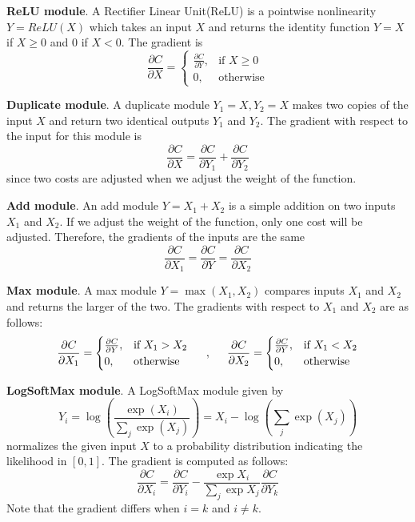 \textbf{ReLU module}.
A Rectifier Linear Unit(ReLU) is a pointwise nonlinearity $Y=ReLU(X)$ which takes an input $X$ and returns the identity function $Y=X$ if $X\geq0$ and $0$ if $X<0$.
The gradient is 
\[
    \frac{\partial C}{\partial X} =
    \begin{cases}
     \frac{\partial C}{\partial Y}, &\text{if } X\geq 0 \\
      0 , &\text{otherwise}
    \end{cases}
\]

\textbf{Duplicate module}.
A duplicate module $Y_1=X, Y_2=X$ makes two copies of the input $X$ and return two identical outputs $Y_1$ and $Y_2$.
The gradient with respect to the input for this module is 
\[
\frac{\partial C}{\partial X} = \frac{\partial C}{\partial Y_1} + \frac{\partial C}{\partial Y_2}
\]
since two costs are adjusted when we adjust the weight of the function.

\textbf{Add module}.
An add module $Y=X_1+X_2$ is a simple addition on two inputs $X_1$ and $X_2$.
If we adjust the weight of the function, only one cost will be adjusted.
Therefore, the gradients of the inputs are the same
\[
\frac{\partial C}{\partial X_1} = \frac{\partial C}{\partial Y} = \frac{\partial C}{\partial X_2}
\]

\textbf{Max module}.
A max module $Y = \max(X_1, X_2)$ compares inputs $X_1$ and $X_2$ and returns the larger of the two.  
The gradients with respect to $X_1$ and $X_2$ are as follows:
\[
    \frac{\partial C}{\partial X_1} =
    \begin{cases}
     \frac{\partial C}{\partial Y}, &\text{if } X_1 > X_2 \\
      0 , &\text{otherwise}
    \end{cases} \hspace{5mm},\hspace{5mm}
    \frac{\partial C}{\partial X_2} =
    \begin{cases}
     \frac{\partial C}{\partial Y}, &\text{if } X_1 < X_2 \\
      0 , &\text{otherwise}
    \end{cases}
\]

\textbf{LogSoftMax module}.
A LogSoftMax module given by
\[
Y_i=\log\left(\frac{\exp{(X_i)}}{\sum_j\exp{(X_j)}}\right) = X_i - \log\left(\sum_j\exp{(X_j)}\right)
\]
normalizes the given input $X$ to a probability distribution indicating the likelihood in $[0,1]$.
The gradient is computed as follows:
\[    
\frac{\partial C}{\partial X_i}=\frac{\partial C}{\partial Y_i} - \frac{\exp{X_i}}{\sum_j \exp{X_j}} \frac{\partial C}{\partial Y_k}
\]
Note that the gradient differs when $i=k$ and $i\neq k$.